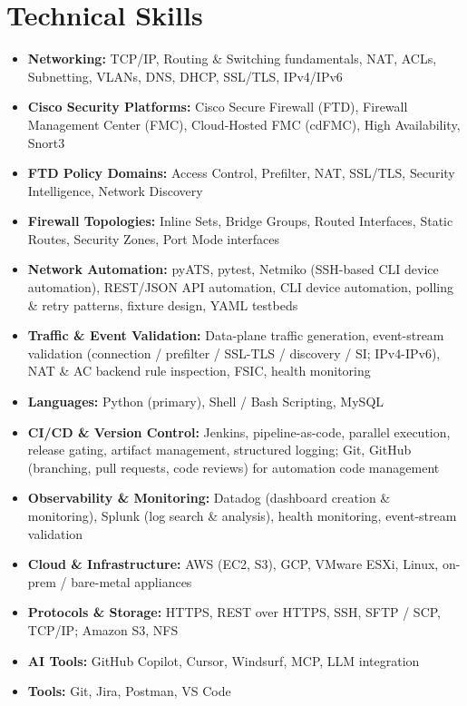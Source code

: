 \documentclass[letterpaper,11pt]{article}
\begin{document}
\section{Technical Skills}
\begin{itemize}[leftmargin=0.15in, label={}]
  \item \textbf{Networking:} TCP/IP, Routing \& Switching fundamentals, NAT, ACLs, Subnetting, VLANs, DNS, DHCP, SSL/TLS, IPv4/IPv6
  \item \textbf{Cisco Security Platforms:} Cisco Secure Firewall (FTD), Firewall Management Center (FMC), Cloud-Hosted FMC (cdFMC), High Availability, Snort3
  \item \textbf{FTD Policy Domains:} Access Control, Prefilter, NAT, SSL/TLS, Security Intelligence, Network Discovery
  \item \textbf{Firewall Topologies:} Inline Sets, Bridge Groups, Routed Interfaces, Static Routes, Security Zones, Port Mode interfaces
  \item \textbf{Network Automation:} pyATS, pytest, Netmiko (SSH-based CLI device automation), REST/JSON API automation, CLI device automation, polling \& retry patterns, fixture design, YAML testbeds
  \item \textbf{Traffic \& Event Validation:} Data-plane traffic generation, event-stream validation (connection / prefilter / SSL-TLS / discovery / SI; IPv4-IPv6), NAT \& AC backend rule inspection, FSIC, health monitoring
  \item \textbf{Languages:} Python (primary), Shell / Bash Scripting, MySQL
  \item \textbf{CI/CD \& Version Control:} Jenkins, pipeline-as-code, parallel execution, release gating, artifact management, structured logging; Git, GitHub (branching, pull requests, code reviews) for automation code management
  \item \textbf{Observability \& Monitoring:} Datadog (dashboard creation \& monitoring), Splunk (log search \& analysis), health monitoring, event-stream validation
  \item \textbf{Cloud \& Infrastructure:} AWS (EC2, S3), GCP, VMware ESXi, Linux, on-prem / bare-metal appliances
  \item \textbf{Protocols \& Storage:} HTTPS, REST over HTTPS, SSH, SFTP / SCP, TCP/IP; Amazon S3, NFS
  \item \textbf{AI Tools:} GitHub Copilot, Cursor, Windsurf, MCP, LLM integration
  \item \textbf{Tools:} Git, Jira, Postman, VS Code
\end{itemize}
\vspace{4pt}
\end{document}
